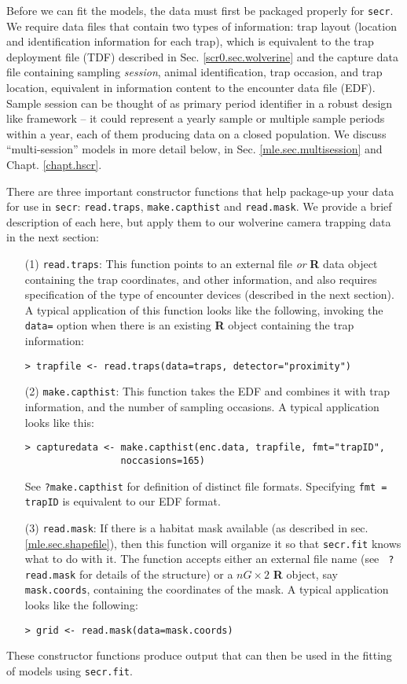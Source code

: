 Before we can fit the models, the data must first be packaged properly
for \mbox{\tt secr}.  We require data files that contain two types of
information: trap layout (location and identification information for
each trap), which is equivalent to the trap deployment file (TDF)
described in Sec. \ref{scr0.sec.wolverine} and the capture data file
containing sampling {\it session}, animal identification, trap
occasion, and trap location, equivalent in information content to the
encounter data file (EDF).  Sample session can be thought of as
primary period identifier in a robust design like framework -- it
could represent a yearly sample or multiple sample periods within a
year, each of them producing data on a closed population. We discuss
``multi-session'' models in more detail below, in
Sec. \ref{mle.sec.multisession} and Chapt. \ref{chapt.hscr}.


There are three important constructor functions that help package-up
your 
data for use in \mbox{\tt secr}:
\mbox{\tt read.traps},
\mbox{\tt make.capthist} and
\mbox{\tt read.mask}. 
We provide a brief description of each here, but apply them to our
wolverine camera trapping data in the next section:
\begin{itemize}
\item[(1)] 
\mbox{\tt read.traps}: This function points to an external file {\it or}
{\bf R} data object containing the trap coordinates, and other
information, and also requires specification of the type of encounter
devices (described in the next section). A typical application of this
function looks like the following, invoking the \mbox{\tt data=} option 
when there is an existing {\bf R} object
containing the trap information:
\begin{verbatim}
> trapfile <- read.traps(data=traps, detector="proximity")
\end{verbatim}
\item[(2)] \mbox{\tt make.capthist}: This function takes the EDF and combines it
with trap information, and the number of sampling occasions. A typical
application looks like this:
\begin{verbatim}
> capturedata <- make.capthist(enc.data, trapfile, fmt="trapID",
                 noccasions=165)
\end{verbatim}
See \mbox{\tt ?make.capthist} for definition of distinct file
formats. Specifying  \mbox{\tt fmt = trapID}  is equivalent to our EDF format.
\item[(3)] \mbox{\tt read.mask}: If there is a habitat mask
  available 
(as described in sec. \ref{mle.sec.shapefile}), then this function
will organize it so that \mbox{\tt secr.fit} knows what to do with it.
The function accepts either an external file name (see \mbox{\tt
  ?read.mask} for details of the structure) or a $nG \times 2$ {\bf R}
object, say \mbox{\tt mask.coords},
containing the coordinates of the mask. A typical application looks
like the following:
\begin{verbatim}
> grid <- read.mask(data=mask.coords)
\end{verbatim}
\end{itemize}
These constructor functions produce output that can then be used in
the fitting of models using \mbox{\tt secr.fit}.

